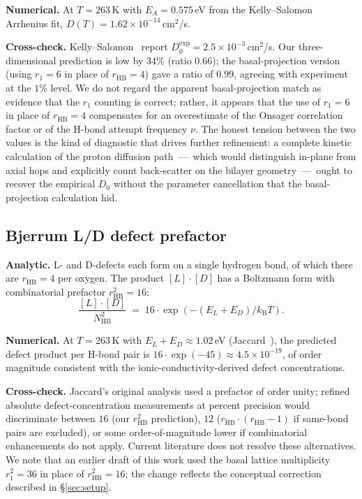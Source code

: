 \documentclass[final]{siamltex}
\newcommand{\kB}{k_{\mathrm{B}}}
\begin{document}
\textbf{Numerical.}  At $T = 263$\,K with $E_A = 0.575$\,eV from
the Kelly--Salomon Arrhenius fit, $D(T) = 1.62 \times
10^{-14}$\,cm$^2$/s.

\textbf{Cross-check.}  Kelly--Salomon~\cite{KellySalomon1969}
report $D_0^{\mathrm{exp}} = 2.5 \times 10^{-3}$\,cm$^2$/s.  Our
three-dimensional prediction is low by $34\%$ (ratio $0.66$); the
basal-projection version (using $r_1 = 6$ in place of
$r_{\mathrm{HB}} = 4$) gave a ratio of $0.99$, agreeing with
experiment at the $1\%$ level.  We do not regard the apparent
basal-projection match as evidence that the $r_1$ counting is
correct; rather, it appears that the use of $r_1 = 6$ in place of
$r_{\mathrm{HB}} = 4$ compensates for an overestimate of the
Onsager correlation factor or of the H-bond attempt frequency $\nu$.
The honest tension between the two values is the kind of
diagnostic that drives further refinement: a complete kinetic
calculation of the proton diffusion path~---~which would
distinguish in-plane from axial hops and explicitly count
back-scatter on the bilayer geometry~---~ought to recover the
empirical $D_0$ without the parameter cancellation that the
basal-projection calculation hid.

\subsection{Bjerrum L/D defect prefactor}
\label{sec:bjerrum}

\textbf{Analytic.}  L- and D-defects each form on a single
hydrogen bond, of which there are $r_{\mathrm{HB}} = 4$ per
oxygen.  The product $[L]\!\cdot\![D]$ has a Boltzmann form with
combinatorial prefactor $r_{\mathrm{HB}}^2 = 16$:
\begin{equation}
\frac{[L]\cdot[D]}{N_{\mathrm{HB}}^2} \;=\; 16 \cdot
       \exp(-(E_L + E_D)/\kB T).
\end{equation}

\textbf{Numerical.}  At $T = 263$\,K with $E_L + E_D \approx
1.02$\,eV (Jaccard~\cite{PetrenkoWhitworth1999}), the predicted
defect product per H-bond pair is $16 \cdot \exp(-45) \approx
4.5 \times 10^{-19}$, of order magnitude consistent with the
ionic-conductivity-derived defect concentrations.

\textbf{Cross-check.}  Jaccard's original analysis used a
prefactor of order unity; refined absolute defect-concentration
measurements at percent precision would discriminate between $16$
(our $r_{\mathrm{HB}}^2$ prediction), $12$ ($r_{\mathrm{HB}} \cdot
(r_{\mathrm{HB}} - 1)$ if same-bond pairs are excluded), or some
order-of-magnitude lower if combinatorial enhancements do not
apply.  Current literature does not resolve these alternatives.
We note that an earlier draft of this work used the basal lattice
multiplicity $r_1^2 = 36$ in place of $r_{\mathrm{HB}}^2 = 16$;
the change reflects the conceptual correction described in
\S\ref{sec:setup}.
\end{document}
